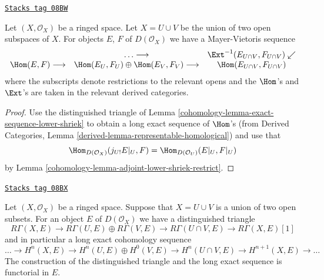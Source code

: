 \begin{lemma}
\label{cohomology-lemma-mayer-vietoris-hom}
\href{https://stacks.math.columbia.edu/tag/08BW}{\texttt{Stacks tag 08BW}}

Let $(X, \mathcal{O}_X)$ be a ringed space. Let $X = U \cup V$ be
the union of two open subspaces of $X$.
For objects $E$, $F$ of $D(\mathcal{O}_X)$ we have a
Mayer-Vietoris sequence
$$
\begin{array}{ccc} & \ldots \longrightarrow & \Ext^{-1}(E_{U \cap V}, F_{U \cap V}) \swarrow \\ \Hom(E, F) \longrightarrow & \Hom(E_U, F_U) \oplus
\Hom(E_V, F_V) \longrightarrow & \Hom(E_{U \cap V}, F_{U \cap V})\end{array}
$$
where the subscripts denote restrictions to the relevant opens
and the $\Hom$'s and $\Ext$'s are taken in the relevant
derived categories.
\end{lemma}

\begin{proof}

Use the distinguished triangle of
Lemma \ref{cohomology-lemma-exact-sequence-lower-shriek}
to obtain a long exact sequence of $\Hom$'s
(from Derived Categories, Lemma \ref{derived-lemma-representable-homological})
and use that
$$
\Hom_{D(\mathcal{O}_X)}(j_{U!}E|_U, F) =
\Hom_{D(\mathcal{O}_U)}(E|_U, F|_U)
$$
by Lemma \ref{cohomology-lemma-adjoint-lower-shriek-restrict}.
\end{proof}

\begin{lemma}
\label{cohomology-lemma-unbounded-mayer-vietoris}
\href{https://stacks.math.columbia.edu/tag/08BX}{\texttt{Stacks tag 08BX}}

Let $(X, \mathcal{O}_X)$ be a ringed space. Suppose that
$X = U \cup V$ is a union of two open subsets. For an object $E$
of $D(\mathcal{O}_X)$ we have a distinguished triangle
$$
R\Gamma(X, E) \to R\Gamma(U, E) \oplus R\Gamma(V, E) \to
R\Gamma(U \cap V, E) \to R\Gamma(X, E)[1]
$$
and in particular a long exact cohomology sequence
$$
\ldots \to
H^n(X, E) \to
H^n(U, E) \oplus H^0(V, E) \to
H^n(U \cap V, E) \to
H^{n + 1}(X, E) \to \ldots
$$
The construction of the distinguished triangle and the
long exact sequence is functorial in $E$.
\end{lemma}

